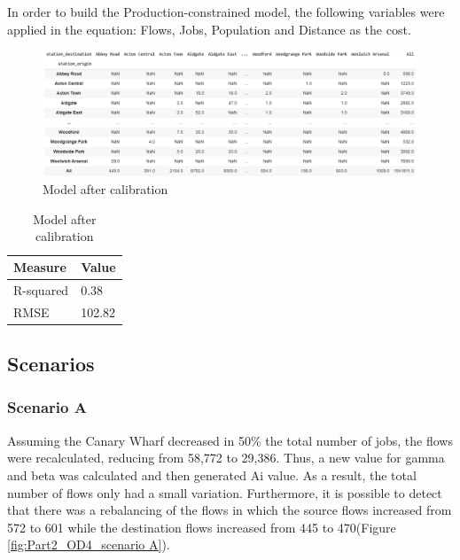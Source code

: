 \documentclass[10pt]{report}
\numberwithin{figure}{section}
\numberwithin{table}{section}
\begin{document}
In order to build the Production-constrained model, the following variables were applied in the equation: Flows, Jobs, Population and Distance as the cost\cite{neira_working_2022}. 

    \begin{figure}[htp]
        \centering
        \includegraphics[width=16cm]{Image/Part2_OD2.png}
        \caption{Model after calibration}
        \label{fig: Model after calibration}
    \end{figure}

\vspace{5mm} %

    \begin{table}[h]
    \centering
    \begin{tabular}{@{}ll@{}}
    \toprule
    \textbf{Measure} & \textbf{Value} \\ \midrule
    R-squared        & 0.38           \\
    RMSE             & 102.82     
    \end{tabular}
    \caption{Model after calibration}
    \label{table: calibration}
    \end{table}

\newpage    

\subsection{Scenarios}
\subsubsection{Scenario A}

Assuming the Canary Wharf decreased in 50\% the total number of jobs, the flows were recalculated, reducing from 58,772 to 29,386. Thus, a new value for gamma and beta was calculated and then generated Ai value. As a result, the total number of flows only had a small variation. Furthermore, it is possible to detect that there was a rebalancing of the flows in which the source flows increased from 572 to 601 while the destination flows increased from 445 to 470(Figure \ref{fig:Part2_OD4_scenario A}).
\end{document}
